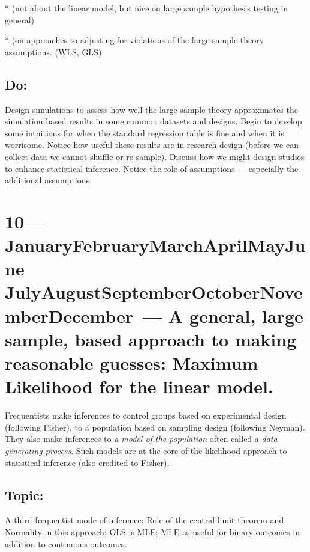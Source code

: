\documentclass[10pt]{article}
\def\themonth{\ifcase\month\or
  January\or February\or March\or April\or May\or June\or
  July\or August\or September\or October\or November\or December\fi}
\begin{document}
*\citealp[Chap 9]{trosset2009isi} (not about the linear model, but nice
on large sample hypothesis testing in general)

*\citealp[Chap 12]{fox2008applied} (on approaches to adjusting for
violations of the large-sample theory assumptions. (WLS, GLS)

\subsection{Do:} Design simulations to assess how well the
large-sample theory approximates the simulation based results in some
common datasets and designs. Begin to develop some intuitions for when
the standard regression table is fine and when it is worrisome. Notice
how useful these results are in research design (before we can collect
data we cannot shuffle or re-sample). Discuss how we might design
studies to enhance statistical inference. Notice the role of
assumptions --- especially the additional assumptions.



\AdvanceDate[7]
\section{10---\themonth~\the\day--- A general, large sample, based approach to
  making reasonable guesses: Maximum Likelihood for the linear model.}

Frequentists make inferences to control groups based on experimental
design (following Fisher), to a population based on sampling design
(following Neyman). They also make inferences to \emph{a model of the
  population} often called a \emph{data generating process}. Such
models are at the core of the likelihood approach to statistical
inference (also credited to Fisher).

\subsection{Topic:} A third frequentist mode of inference; Role of the
central limit theorem and Normality in this approach; OLS is MLE; MLE
as useful for binary outcomes in addition to continuous outcomes.
\end{document}
